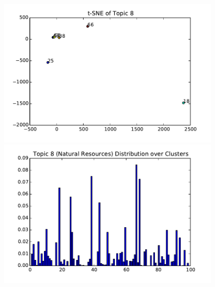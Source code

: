 \documentclass[11pt]{article}
\begin{document}
\begin{figure}
\centering
\includegraphics[width=\columnwidth]{assets/gtm100_topic8_tsne.pdf}
\includegraphics[width=\columnwidth]{assets/gtm100_topic8_probs.pdf}


\end{figure}
\end{document}
